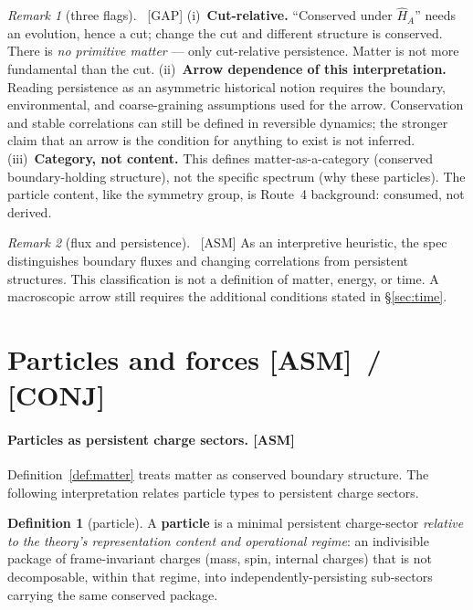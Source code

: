 \documentclass[11pt]{article}
\newcommand{\asm}{\textcolor{blue!70!black}{\textsf{\small[ASM]}}}
\newcommand{\conj}{\textcolor{orange!80!black}{\textsf{\small[CONJ]}}}
\newcommand{\post}{\textcolor{purple!70!black}{\textsf{\small[POST]}}}
\newcommand{\gap}{\textcolor{red!75!black}{\textsf{\small[GAP]}}}
\def\conj{[CONJ]}\def\post{[POST]}\def\gap{[GAP]}%
\def\quad{ }\def\normalsize{}%
\theoremstyle{definition}
\newtheorem{definition}{Definition}[section]
\theoremstyle{remark}
\newtheorem*{remark}{Remark}
\begin{document}
\begin{remark}[three flags]{\normalfont\ \gap}
(i)~\textbf{Cut-relative.} ``Conserved under $\hat{H}_A$'' needs an evolution, hence a cut; change the cut and different structure is conserved. There is \emph{no primitive matter} --- only cut-relative persistence. Matter is not more fundamental than the cut.
(ii)~\textbf{Arrow dependence of this interpretation.} Reading persistence as an asymmetric historical notion requires the boundary, environmental, and coarse-graining assumptions used for the arrow. Conservation and stable correlations can still be defined in reversible dynamics; the stronger claim that an arrow is the condition for anything to exist is not inferred.
(iii)~\textbf{Category, not content.} This defines matter-as-a-category (conserved boundary-holding structure), not the specific spectrum (why these particles). The particle content, like the symmetry group, is Route~4 background: consumed, not derived.
\end{remark}

\begin{remark}[flux and persistence]{\normalfont\ \asm}
As an interpretive heuristic, the spec distinguishes boundary fluxes and changing correlations from persistent structures. This classification is not a definition of matter, energy, or time. A macroscopic arrow still requires the additional conditions stated in \S\ref{sec:time}.
\end{remark}

\section{Particles and forces \quad{\normalsize\asm\ / \conj}\label{sec:pf}}

\paragraph{Particles as persistent charge sectors. \asm}
Definition~\ref{def:matter} treats matter as conserved boundary structure. The following interpretation relates particle types to persistent charge sectors.

\begin{definition}[particle]\label{def:particle}
A \textbf{particle} is a minimal persistent charge-sector \emph{relative to the theory's representation content and operational regime}: an indivisible package of frame-invariant charges (mass, spin, internal charges) that is not decomposable, within that regime, into independently-persisting sub-sectors carrying the same conserved package.
\end{definition}
\end{document}
